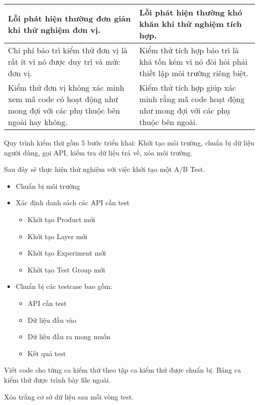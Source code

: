 \begin{table}[H]
\begin{tabular}{|p{8cm}|p{8cm}|}
		Lỗi phát hiện thường đơn giản khi thử nghiệm đơn vị.                                                                                                      & Lỗi phát hiện thường khó khăn khi thử nghiệm tích hợp.                                                                                       \\ \hline
		Chi phí bảo trì kiểm thử đơn vị là rất ít vì nó được duy trì và mức đơn vị.                                                                               & Kiểm thử tích hợp bảo trì là khá tốn kém vì nó đòi hỏi phải thiết lập môi trường riêng biệt.                                                 \\ \hline
		Kiểm thử đơn vị không xác minh xem mã code có hoạt động như mong đợi với các phụ thuộc bên ngoài hay không.                                               & Kiểm thử tích hợp giúp xác minh rằng mã code hoạt động như mong đợi với các phụ thuộc bên ngoài.                                             \\ \hline
	\end{tabular}
\end{table}

Quy trình kiểm thử gồm 5 bước triển khai: Khởi tạo môi trường, chuẩn bị dữ liệu người dùng, gọi API, kiểm tra dữ liệu trả về, xóa môi trường.


Sau đây sẽ thực hiện thử nghiệm với việc khởi tạo một A/B Test.

\begin{itemize}
	\item Chuẩn bị môi trường
	\item Xác định danh sách các API cần test
	      \begin{itemize}
		      \item Khởi tạo Product mới
		      \item Khởi tạo Layer mới
		      \item Khởi tạo Experiment mới
		      \item Khởi tạo Test Group mới
	      \end{itemize}
	\item Chuẩn bị các testcase bao gồm:
	      \begin{itemize}
		      \item API cần test
		      \item Dữ liệu đầu vào
		      \item Dữ liệu đầu ra mong muốn
		      \item Kết quả test
	      \end{itemize}
\end{itemize}

Viết code cho từng ca kiểm thử theo tập ca kiểm thử được chuẩn bị. Bảng ca kiểm thử được trình bày file ngoài.

Xóa trắng cơ sở dữ liệu sau mỗi vòng test.


